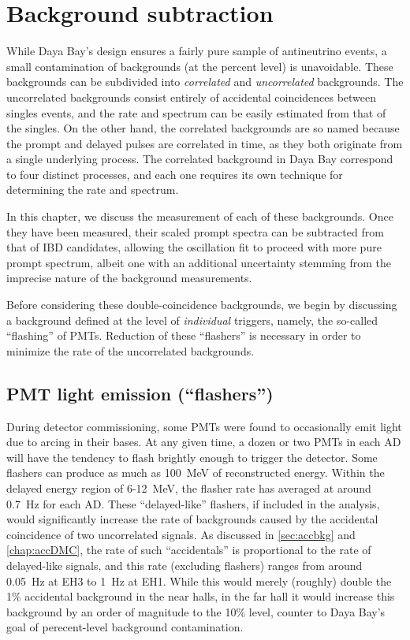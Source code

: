 \documentclass[../thesis.tex]{subfiles}
\begin{document}
\chapter{Background subtraction}
\label{chap:bkg}

While Daya Bay's design ensures a fairly pure sample of antineutrino events, a small contamination of backgrounds (at the percent level) is unavoidable. These backgrounds can be subdivided into \emph{correlated} and \emph{uncorrelated} backgrounds. The uncorrelated backgrounds consist entirely of accidental coincidences between singles events, and the rate and spectrum can be easily estimated from that of the singles. On the other hand, the correlated backgrounds are so named because the prompt and delayed pulses are correlated in time, as they both originate from a single underlying process. The correlated background in Daya Bay correspond to four distinct processes, and each one requires its own technique for determining the rate and spectrum.

In this chapter, we discuss the measurement of each of these backgrounds. Once they have been measured, their scaled prompt spectra can be subtracted from that of IBD candidates, allowing the oscillation fit to proceed with more pure prompt spectrum, albeit one with an additional uncertainty stemming from the imprecise nature of the background measurements.

Before considering these double-coincidence backgrounds, we begin by discussing a background defined at the level of \emph{individual} triggers, namely, the so-called ``flashing'' of PMTs. Reduction of these ``flashers'' is necessary in order to minimize the rate of the uncorrelated backgrounds.

\section{PMT light emission (``flashers'')}
\label{sec:bkgFlashers}

During detector commissioning, some PMTs were found to occasionally emit light due to arcing in their bases. At any given time, a dozen or two PMTs in each AD will have the tendency to flash brightly enough to trigger the detector. Some flashers can produce as much as 100~MeV of reconstructed energy. Within the delayed energy region of 6-12~MeV, the flasher rate has averaged at around 0.7~Hz for each AD. These ``delayed-like'' flashers, if included in the analysis, would significantly increase the rate of backgrounds caused by the accidental coincidence of two uncorrelated signals. As discussed in \autoref{sec:accbkg} and \autoref{chap:accDMC}, the rate of such ``accidentals'' is proportional to the rate of delayed-like signals, and this rate (excluding flashers) ranges from around 0.05~Hz at EH3 to 1~Hz at EH1. While this would merely (roughly) double the 1\% accidental background in the near halls, in the far hall it would increase this background by an order of magnitude to the 10\% level, counter to Daya Bay's goal of perecent-level background contamination.
\end{document}
